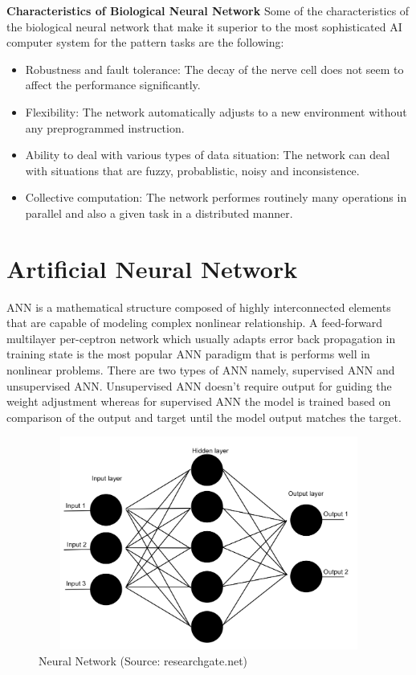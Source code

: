   \textbf{Characteristics of Biological Neural Network} \newline
Some of the characteristics of the biological neural network that make it superior to the most sophisticated AI computer system for the pattern tasks are the following:
\begin{itemize}
    \item Robustness and fault tolerance: The decay of the nerve cell does not seem to affect the performance significantly.
    \item Flexibility: The network automatically adjusts to a new environment without any preprogrammed instruction.
    \item Ability to deal with various types of data situation: The network can deal with situations that are fuzzy, probablistic, noisy and inconsistence.
    \item Collective computation: The network performes routinely many operations in parallel and also a given task in a distributed manner.
     
\end{itemize}


\section{Artificial Neural Network}
ANN is a mathematical structure composed of highly interconnected elements that are capable of modeling complex nonlinear relationship. A feed-forward multilayer per-ceptron network which usually adapts error back propagation in training state is the most popular ANN paradigm that is performs well in nonlinear problems. There are two types of ANN namely,  supervised ANN and unsupervised ANN. Unsupervised ANN doesn’t require output for guiding the weight adjustment whereas for supervised ANN the model is trained based on comparison of the output and target until the model output matches the target.

   \begin{figure}[h]
   \includegraphics[width=120mm,height=70mm]{neuralNetwork/neuralNetwork.jpg}
   \caption{Neural Network (Source: researchgate.net)}
        
   \end{figure}
